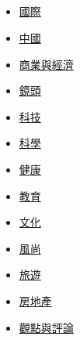 \hypertarget{-1}{%
\subsection{\texorpdfstring{\href{/}{}}{}}\label{-1}}

\begin{itemize}
\tightlist
\item
  \href{/world/?utm_source=nav-footer-mobile}{國際}
\item
  \href{/china/?utm_source=nav-footer-mobile}{中國}
\item
  \href{/business/?utm_source=nav-footer-mobile}{商業與經濟}
\item
  \href{/lens/?utm_source=nav-footer-mobile}{鏡頭}
\item
  \href{/technology/?utm_source=nav-footer-mobile}{科技}
\item
  \href{/science/?utm_source=nav-footer-mobile}{科學}
\item
  \href{/health/?utm_source=nav-footer-mobile}{健康}
\item
  \href{/education/?utm_source=nav-footer-mobile}{教育}
\item
  \href{/culture/?utm_source=nav-footer-mobile}{文化}
\item
  \href{/style/?utm_source=nav-footer-mobile}{風尚}
\item
  \href{/travel/?utm_source=nav-footer-mobile}{旅遊}
\item
  \href{/real-estate/?utm_source=nav-footer-mobile}{房地產}
\item
  \href{/opinion/?utm_source=nav-footer-mobile}{觀點與評論}
\end{itemize}

